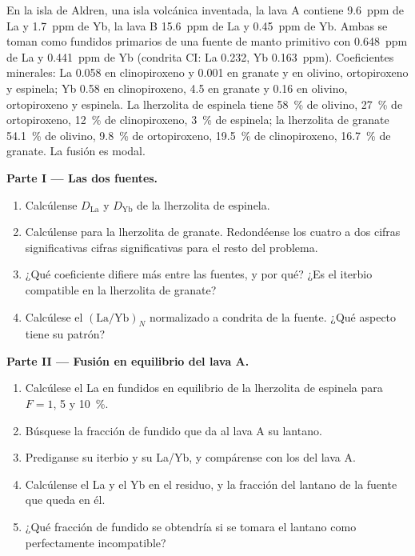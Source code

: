 \begin{problem}\label{pb:b3:trace-element-modelling:1}
En la isla de Aldren, una isla volcánica inventada, la lava A contiene \qty{9.6}{ppm} de La
y \qty{1.7}{ppm} de Yb, la lava B \qty{15.6}{ppm} de La y \qty{0.45}{ppm} de Yb.
Ambas se toman como fundidos primarios de una fuente de manto primitivo con
\qty{0.648}{ppm} de La y \qty{0.441}{ppm} de Yb (condrita CI: La 0.232, Yb
\qty{0.163}{ppm}). Coeficientes minerales: La 0.058 en clinopiroxeno y 0.001
en granate y en olivino, ortopiroxeno y espinela; Yb 0.58 en
clinopiroxeno, 4.5 en granate y 0.16 en olivino, ortopiroxeno y espinela.
La lherzolita de espinela tiene \qty{58}{\percent} de olivino, \qty{27}{\percent} de ortopiroxeno, \qty{12}{\percent}
de clinopiroxeno, \qty{3}{\percent} de espinela; la lherzolita de granate \qty{54.1}{\percent} de olivino, \qty{9.8}{\percent}
de ortopiroxeno, \qty{19.5}{\percent} de clinopiroxeno, \qty{16.7}{\percent} de granate. La fusión es modal.

\medskip\noindent\textbf{Parte I --- Las dos fuentes.}
\begin{enumerate}
\item Calcúlense $D_{\mathrm{La}}$ y $D_{\mathrm{Yb}}$ de la lherzolita de espinela.
\item Calcúlense para la lherzolita de granate. Redondéense los cuatro a dos cifras significativas
cifras significativas para el resto del problema.
\item ¿Qué coeficiente difiere más entre las fuentes, y por qué? ¿Es
el iterbio compatible en la lherzolita de granate?
\item Calcúlese el $(\mathrm{La}/\mathrm{Yb})_N$ normalizado a condrita de la
fuente. ¿Qué aspecto tiene su patrón?
\end{enumerate}

\medskip\noindent\textbf{Parte II --- Fusión en equilibrio del lava A.}
\begin{enumerate}[resume]
\item Calcúlese el La en fundidos en equilibrio de la lherzolita de espinela para $F = 1$, 5 y
\qty{10}{\percent}.
\item Búsquese la fracción de fundido que da al lava A su lantano.
\item Prediganse su iterbio y su La/Yb, y compárense con los del lava A.
\item Calcúlense el La y el Yb en el residuo, y la fracción del
lantano de la fuente que queda en él.
\item ¿Qué fracción de fundido se obtendría si se tomara el lantano como perfectamente
incompatible?
\end{enumerate}


\end{problem}
